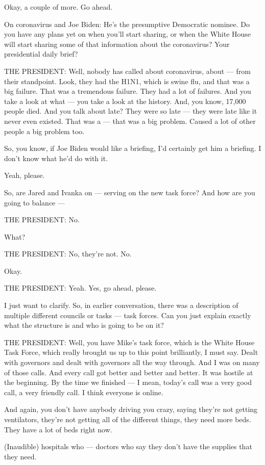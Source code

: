 Okay, a couple of more. Go ahead.

On coronavirus and Joe Biden: He's the presumptive Democratic nominee.
Do you have any plans yet on when you'll start sharing, or when the
White House will start sharing some of that information about the
coronavirus? Your presidential daily brief?

THE PRESIDENT: Well, nobody has called about coronavirus, about --- from
their standpoint. Look, they had the H1N1, which is swine flu, and that
was a big failure. That was a tremendous failure. They had a lot of
failures. And you take a look at what --- you take a look at the
history. And, you know, 17,000 people died. And you talk about late?
They were so late --- they were late like it never even existed. That
was a --- that was a big problem. Caused a lot of other people a big
problem too.

So, you know, if Joe Biden would like a briefing, I'd certainly get him
a briefing. I don't know what he'd do with it.

Yeah, please.

So, are Jared and Ivanka on --- serving on the new task force? And how
are you going to balance ---

THE PRESIDENT: No.

What?

THE PRESIDENT: No, they're not. No.

Okay.

THE PRESIDENT: Yeah. Yes, go ahead, please.

I just want to clarify. So, in earlier conversation, there was a
description of multiple different councils or tasks --- task forces. Can
you just explain exactly what the structure is and who is going to be on
it?

THE PRESIDENT: Well, you have Mike's task force, which is the White
House Task Force, which really brought us up to this point brilliantly,
I must say. Dealt with governors and dealt with governors all the way
through. And I was on many of those calls. And every call got better and
better and better. It was hostile at the beginning. By the time we
finished --- I mean, today's call was a very good call, a very friendly
call. I think everyone is online.

And again, you don't have anybody driving you crazy, saying they're not
getting ventilators, they're not getting all of the different things,
they need more beds. They have a lot of beds right now.

(Inaudible) hospitals who --- doctors who say they don't have the
supplies that they need.

